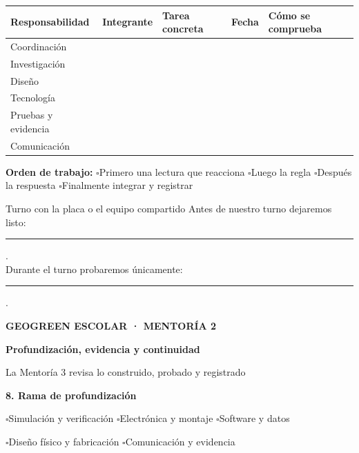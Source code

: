 \documentclass[10pt,a4paper]{article}
\newcommand{\checkline}[1]{$\square$\hspace{1.5mm}#1}
\newcommand{\pagehead}[2]{%
  {\small\bfseries\textcolor{AIEPRed}{GEOGREEN ESCOLAR · MENTORÍA 2}}\par
  \vspace{2mm}
  {\LARGE\bfseries\color{AIEPNavy}#1\par}
  {\normalsize\color{AIEPMuted}#2\par}
  \vspace{4mm}
}
\begin{document}
\footnotesize
\begin{tabularx}{\textwidth}{|p{27mm}|p{28mm}|Y|p{20mm}|p{38mm}|}
\hline
\textbf{Responsabilidad} & \textbf{Integrante} & \textbf{Tarea concreta} & \textbf{Fecha} & \textbf{Cómo se comprueba} \\
\hline
\rule{0pt}{14mm}Coordinación & & & & \\
\hline
\rule{0pt}{14mm}Investigación & & & & \\
\hline
\rule{0pt}{14mm}Diseño & & & & \\
\hline
\rule{0pt}{14mm}Tecnología & & & & \\
\hline
\rule{0pt}{14mm}Pruebas y evidencia & & & & \\
\hline
\rule{0pt}{14mm}Comunicación & & & & \\
\hline
\end{tabularx}
\normalsize

\begin{tcolorbox}[colback=AIEPBlueSoft,colframe=AIEPLine,boxrule=0.5pt,arc=1mm,left=3mm,right=3mm,top=2mm,bottom=2mm]
\textbf{Orden de trabajo:}\quad
\checkline{Primero una lectura que reacciona}\quad
\checkline{Luego la regla}\quad
\checkline{Después la respuesta}\quad
\checkline{Finalmente integrar y registrar}
\end{tcolorbox}

\begin{accentfield}[height=26mm]{Turno con la placa o el equipo compartido}
Antes de nuestro turno dejaremos listo: \rule{99mm}{0.35pt}.\\[4mm]
Durante el turno probaremos únicamente: \rule{92mm}{0.35pt}.
\end{accentfield}

\newpage
\pagehead{Profundización, evidencia y continuidad}{La Mentoría 3 revisa lo construido, probado y registrado}

{\large\bfseries\color{AIEPNavy}8. Rama de profundización}\par
\begin{tcolorbox}[colback=AIEPSoft,colframe=AIEPLine,boxrule=0.5pt,arc=1mm,left=3mm,right=3mm,top=2mm,bottom=2mm]
\checkline{Simulación y verificación}\hspace{4mm}
\checkline{Electrónica y montaje}\hspace{4mm}
\checkline{Software y datos}\par
\checkline{Diseño físico y fabricación}\hspace{4mm}
\checkline{Comunicación y evidencia}
\end{tcolorbox}
\end{document}
